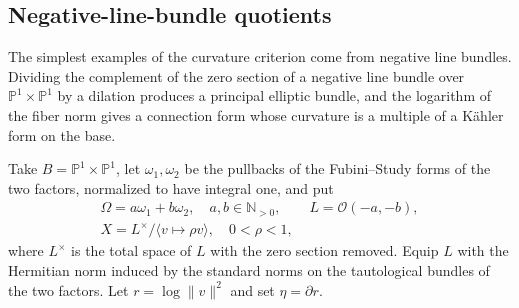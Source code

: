 \subsection{Negative-line-bundle quotients}
\label{sec:elliptic-line-endpoint-examples}

The simplest examples of the curvature criterion come from negative line bundles. Dividing the complement of the zero section of a negative line bundle over $\mathbb P^1\times\mathbb P^1$ by a dilation produces a principal elliptic bundle, and the logarithm of the fiber norm gives a connection form whose curvature is a multiple of a K\"ahler form on the base.

Take $B=\mathbb P^1\times\mathbb P^1$, let $\omega_1,\omega_2$ be the pullbacks of the Fubini--Study forms of the two factors, normalized to have integral one, and put
\[
 \begin{gathered}
 \Omega=a\omega_1+b\omega_2,\quad a,b\in\mathbb N_{>0},\qquad
 L=\mathcal O(-a,-b),\\
 X=L^\times/\langle v\mapsto\rho v\rangle,\quad0<\rho<1,
 \end{gathered}
\]
where $L^\times$ is the total space of $L$ with the zero section removed. Equip $L$ with the Hermitian norm induced by the standard norms on the tautological bundles of the two factors. Let $r=\log\|v\|^2$ and set $\eta=\partial r$.

